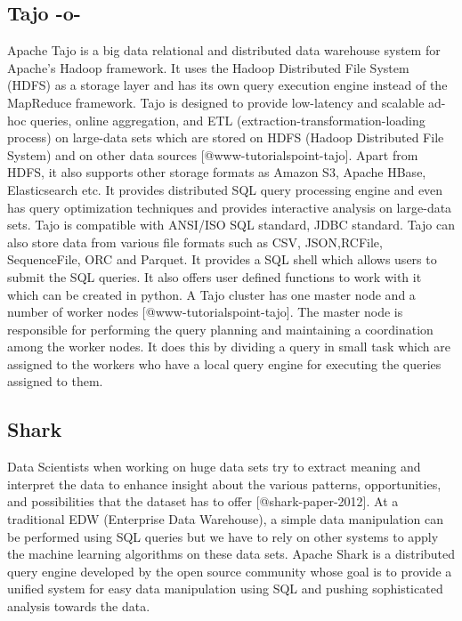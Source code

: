 \subsection{Tajo -o-}

Apache Tajo is a big data relational and distributed data warehouse
system for Apache's Hadoop framework\cite{www-apache-tajo}. It uses
the Hadoop Distributed File System (HDFS) as a storage layer and has
its own query execution engine instead of the MapReduce
framework. Tajo is designed to provide low-latency and scalable ad-hoc
queries, online aggregation, and ETL
(extraction-transformation-loading process) on large-data sets which
are stored on HDFS (Hadoop Distributed File System) and on other data
sources [@www-tutorialspoint-tajo]. Apart from HDFS, it also
supports other storage formats as Amazon S3, Apache HBase,
Elasticsearch etc. It provides distributed SQL query processing engine
and even has query optimization techniques and provides interactive
analysis on large-data sets. Tajo is compatible with ANSI/ISO SQL
standard, JDBC standard. Tajo can also store data from various file
formats such as CSV, JSON,RCFile, SequenceFile, ORC and Parquet. It
provides a SQL shell which allows users to submit the SQL queries. It
also offers user defined functions to work with it which can be
created in python. A Tajo cluster has one master node and a number of
worker nodes [@www-tutorialspoint-tajo]. The master node is
responsible for performing the query planning and maintaining a
coordination among the worker nodes. It does this by dividing a query
in small task which are assigned to the workers who have a local query
engine for executing the queries assigned to them.


     

\subsection{Shark}

Data Scientists when working on huge data sets try to extract meaning
and interpret the data to enhance insight about the various patterns,
opportunities, and possibilities that the dataset has to
offer [@shark-paper-2012]. At a traditional EDW (Enterprise Data
Warehouse), a simple data manipulation can be performed using SQL
queries but we have to rely on other systems to apply the machine
learning algorithms on these data sets. Apache Shark is a distributed
query engine developed by the open source community whose goal is to
provide a unified system for easy data manipulation using SQL and
pushing sophisticated analysis towards the data.

